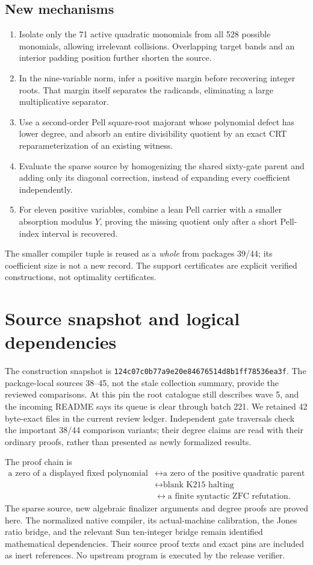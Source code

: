 \documentclass[11pt]{article}
\newcommand{\pin}{\texttt{124c07c0b77a9e20e84676514d8b1ff78536ea3f}}
\begin{document}
\subsection{New mechanisms}
\begin{enumerate}
\item Isolate only the 71 active quadratic monomials from all 528 possible
monomials, allowing irrelevant collisions. Overlapping target bands and an
interior padding position further shorten the source.
\item In the nine-variable norm, infer a positive margin before recovering
integer roots. That margin itself separates the radicands, eliminating a
large multiplicative separator.
\item Use a second-order Pell square-root majorant whose polynomial defect
has lower degree, and absorb an entire divisibility quotient by an exact CRT
reparameterization of an existing witness.
\item Evaluate the sparse source by homogenizing the shared sixty-gate
parent and adding only its diagonal correction, instead of expanding every
coefficient independently.
\item For eleven positive variables, combine a lean Pell carrier with a
smaller absorption modulus $Y$, proving the missing quotient only after a
short Pell-index interval is recovered.
\end{enumerate}
The smaller compiler tuple is reused as a \emph{whole} from packages 39/44;
its coefficient size is not a new record. The support certificates are
explicit verified constructions, not optimality certificates.

\section{Source snapshot and logical dependencies}
The construction snapshot is \pin. The package-local sources 38--45, not
the stale collection summary, provide the reviewed comparisons. At this pin
the root catalogue still describes wave 5, and the incoming README says its
queue is clear through batch 221. We retained 42 byte-exact files in the
current review ledger. Independent gate traversals check the important
38/44 comparison variants; their degree claims are read with their ordinary
proofs, rather than presented as newly formalized results.

The proof chain is
\[
\begin{split}
\text{a zero of a displayed fixed polynomial}
&\longleftrightarrow \text{a zero of the positive quadratic parent}\\
&\longleftrightarrow \text{blank K215 halting}\\
&\longleftrightarrow \text{a finite syntactic ZFC refutation}.
\end{split}
\]
The sparse source, new algebraic finalizer arguments and degree proofs are
proved here. The normalized native compiler, its actual-machine calibration,
the Jones ratio bridge, and the relevant Sun ten-integer bridge remain
identified mathematical dependencies. Their source proof texts and exact
pins are included as inert references. No upstream program is executed by
the release verifier.
\end{document}
